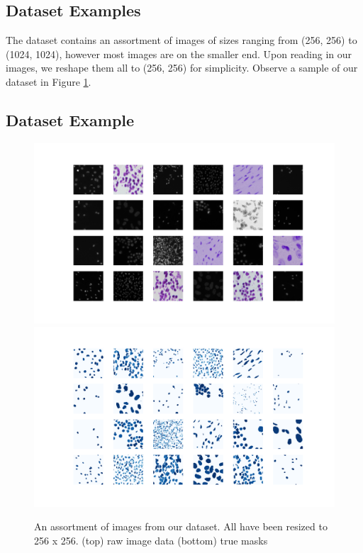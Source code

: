 \documentclass[paper=letter, fontsize=12pt]{article}
\numberwithin{equation}{section} %
\numberwithin{figure}{section} %
\numberwithin{table}{section} %
\begin{document}
\subsection{Dataset Examples}

The dataset contains an assortment of images of sizes ranging from (256, 256)
to (1024, 1024), however most images are on the smaller end.  Upon reading in
our images, we reshape them all to (256, 256) for simplicity.  Observe a sample
of our dataset in Figure \ref{fig:dsbowl18-grid}.

\begin{appendixatend}
    \subsection{Dataset Example}
    \begin{figure}
        \centering
        \includegraphics[width=\textwidth]{./figs/dsbowl18-imagegrid-4x6.png}
        \includegraphics[width=\textwidth]{./figs/dsbowl18-imagegrid-masks-4x6.png}
        \caption{An assortment of images from our dataset.  All have been resized
        to 256 x 256. (top) raw image data (bottom) true masks }
        \label{fig:dsbowl18-grid}
    \end{figure}
\end{appendixatend}
\end{document}
